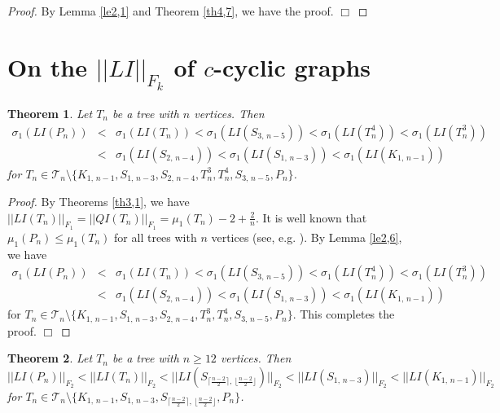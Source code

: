 \documentclass[12pt, a4paper]{article}
\newtheorem{theorem}{Theorem}[section]
\begin{document}
\begin{proof}
By Lemma \ref{le2,1} and Theorem \ref{th4,7}, we have the proof. $\Box$
\end{proof}



\section{\large On the $||LI||_{F_k}$ of $c$-cyclic graphs}


\begin{theorem}\label{th5,1} %
Let $T_n$ be a tree with $n$ vertices. Then
\begin{eqnarray*}
\sigma_1(LI(P_n))& < & \sigma_1(LI(T_n))<\sigma_1(LI(S_{3,\, n-5}))< \sigma_1(LI(T_n^4))<\sigma_1(LI(T_n^3))\\
& < & \sigma_1(LI(S_{2,\, n-4}))<\sigma_1(LI(S_{1,\, n-3}))<\sigma_1(LI(K_{1,\,n-1}))
\end{eqnarray*}
for $T_n\in \mathcal{T}_n\setminus \{K_{1,\,n-1}, S_{1,\, n-3}, S_{2,\, n-4}, T_n^3, T_n^4, S_{3,\, n-5}, P_n \}$.
\end{theorem}

\begin{proof} By Theorems \ref{th3,1}, we have $||LI(T_n)||_{F_1}=||QI(T_n)||_{F_1}=\mu_1(T_n)-2+\frac{2}{n}$.
It is well known that $\mu_1(P_n)\leq \mu_1(T_n)$ for all trees with $n$ vertices (see, e.g. \cite{PG}). By Lemma \ref{le2,6}, we have
\begin{eqnarray*}
\sigma_1(LI(P_n))& < & \sigma_1(LI(T_n))<\sigma_1(LI(S_{3,\, n-5}))< \sigma_1(LI(T_n^4))<\sigma_1(LI(T_n^3))\\
& < & \sigma_1(LI(S_{2,\, n-4}))<\sigma_1(LI(S_{1,\, n-3}))<\sigma_1(LI(K_{1,\,n-1}))
\end{eqnarray*}
for $T_n\in \mathcal{T}_n\setminus \{K_{1,\,n-1}, S_{1,\, n-3}, S_{2,\, n-4}, T_n^3, T_n^4, S_{3,\, n-5}, P_n \}$.
This completes the proof. $\Box$
  \end{proof}



\begin{theorem}\label{th5,2} %
Let $T_n$ be a tree with $n\geq 12$ vertices. Then
$$||LI(P_n)||_{F_2}< ||LI(T_n)||_{F_2}<||LI(S_{\lceil\frac{n-2}{2}\rceil, \, \lfloor\frac{n-2}{2}\rfloor})||_{F_2}<||LI(S_{1,\,n-3})||_{F_2}<||LI(K_{1,\,n-1})||_{F_2}$$
for $T_n\in \mathcal{T}_n\setminus \{K_{1,\,n-1}, S_{1,\, n-3}, S_{\lceil\frac{n-2}{2}\rceil, \, \lfloor\frac{n-2}{2}\rfloor}, P_n \}$.
\end{theorem}
\end{document}
